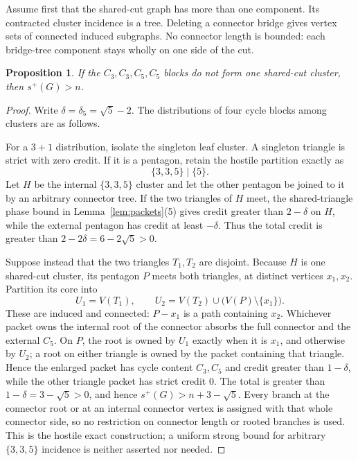 \documentclass[11pt]{article}
\newtheorem{proposition}[theorem]{Proposition}
\theoremstyle{remark}
\begin{document}
Assume first that the shared-cut graph has more than one component.  Its
contracted cluster incidence is a tree.  Deleting a connector bridge gives
vertex sets of connected induced subgraphs.  No connector length is bounded:
each bridge-tree component stays wholly on one side of the cut.

\begin{proposition}\label{prop:3355disconnected}
If the $C_3,C_3,C_5,C_5$ blocks do not form one shared-cut cluster, then
$s^+(G)>n$.
\end{proposition}

\begin{proof}
Write $\delta=\delta_5=\sqrt5-2$.  The distributions of four cycle blocks
among clusters are as follows.

For a $3+1$ distribution, isolate the singleton leaf cluster.  A singleton
triangle is strict with zero credit.  If it is a pentagon, retain the hostile
partition exactly as
\begin{equation}\label{eq:hostile}
 \{3,3,5\}\mid\{5\}.
\end{equation}
Let $H$ be the internal $\{3,3,5\}$ cluster and let the other pentagon be
joined to it by an arbitrary connector tree.  If the two triangles of $H$
meet, the shared-triangle phase bound in Lemma~\ref{lem:packets}(5) gives
credit greater than $2-\delta$ on $H$, while the external pentagon has credit
at least $-\delta$.  Thus the total credit is greater than
$2-2\delta=6-2\sqrt5>0$.

Suppose instead that the two triangles $T_1,T_2$ are disjoint.  Because $H$
is one shared-cut cluster, its pentagon $P$ meets both triangles, at distinct
vertices $x_1,x_2$.  Partition its core into
\[
 U_1=V(T_1),\qquad U_2=V(T_2)\cup\bigl(V(P)\setminus\{x_1\}\bigr).
\]
These are induced and connected: $P-x_1$ is a path containing $x_2$.
Whichever packet owns the internal root of the connector absorbs the full
connector and the external $C_5$.  On $P$, the root is owned by $U_1$ exactly
when it is $x_1$, and otherwise by $U_2$; a root on either triangle is owned
by the packet containing that triangle.  Hence the enlarged packet has cycle
content $C_3,C_5$ and credit greater than $1-\delta$, while the other triangle
packet has strict credit $0$.  The total is greater than
$1-\delta=3-\sqrt5>0$, and hence $s^+(G)>n+3-\sqrt5$.  Every branch at the
connector root or at an internal connector vertex is assigned with that whole
connector side, so no restriction on connector length or rooted branches is
used.  This is the
hostile exact construction; a uniform strong bound for arbitrary
$\{3,3,5\}$ incidence is neither asserted nor needed.


\end{proof}
\end{document}
